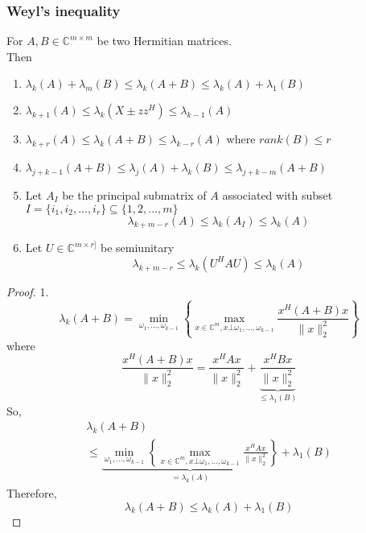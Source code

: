 \begin{multicols}{2}
\subsubsection{Weyl's inequality}
For $A, B\in\mathbb{C}^{m\times m}$ be two Hermitian matrices. \\ Then
\begin{enumerate}
    \item $\lambda_k(A) + \lambda_m(B) \leq \lambda_k(A+B) \leq \lambda_k(A) + \lambda_1(B)$
    \item $\lambda_{k+1}(A) \leq \lambda_k(X\pm zz^H) \leq \lambda_{k-1}(A)$
    \item $\lambda_{k+r}(A) \leq \lambda_k(A+B) \leq \lambda_{k-r}(A)$ where $rank(B)\leq r$
    \item $\lambda_{j+k-1}(A+B) \leq \lambda_j(A) + \lambda_k(B) \leq \lambda_{j+k-m}(A+B)$
    \item Let $A_I$ be the principal submatrix of $A$ associated with subset $I=\{i_1,i_2,...,i_r\}\subseteq \{1,2,...,m\}$
    \[
        \lambda_{k+m-r}(A) \leq \lambda_k(A_I) \leq \lambda_k(A)
    \]
    \item Let $U\in\mathbb{C}^{m\times r]}$ be semiunitary
    \[
        \lambda_{k+m-r} \leq \lambda_k(U^HAU) \leq \lambda_k(A)
    \]
\end{enumerate}
\begin{proof} 1. 
    \[
        \lambda_k(A+B) = \underset{\omega_1,...,\omega_{k-1}}{\min} \left\{\underset{x\in\mathbb{C}^m,x\bot \omega_1,...,\omega_{k-1}}{\max} \frac{x^H(A+B)x}{\|x\|_2^2}\right\}
    \]
    where
    \[
        \frac{x^H(A+B)x}{\|x\|_2^2} = \frac{x^HAx}{\|x\|_2^2} + \underbrace{\frac{x^HBx}{\|x\|_2^2}}_{\leq \lambda_1(B)}
    \]
    So,
    \[
        \begin{array}{l}
            \lambda_k(A+B) \\
            \leq \underbrace{\underset{\omega_1,...,\omega_{k-1}}{\min} \left\{\underset{x\in\mathbb{C}^m,x\bot \omega_1,...,\omega_{k-1}}{\max} \frac{x^HAx}{\|x\|_2^2}\right\}}_{=\lambda_k(A)} + \lambda_1(B)
        \end{array}
    \]
    Therefore,
    \[
        \lambda_k(A+B) \leq \lambda_k(A) + \lambda_1(B)
    \]
\end{proof}


\end{multicols}
